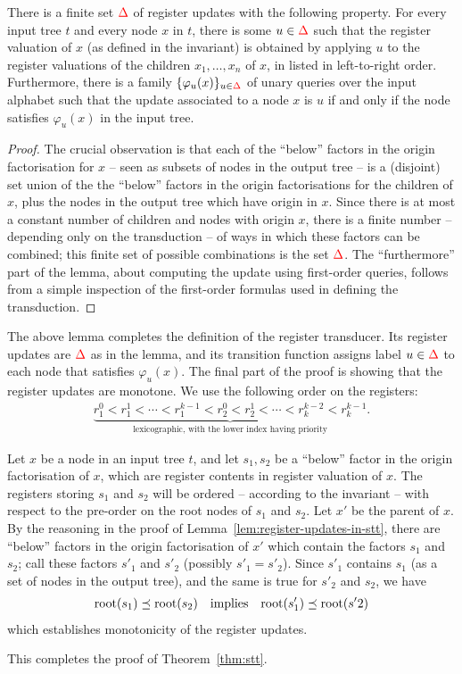 \begin{lemma}\label{lem:register-updates-in-stt}
    There is a finite set ${\color{red}{\Delta}}$ of register updates with the following property. For every  input tree $t$ and every node $x$ in $t$,   there is some $u \in {\color{red}{\Delta}}$ such that the register valuation of $x$ (as defined in the invariant) is obtained by applying $u$ to the register valuations of the children $x_1,\ldots,x_n$ of $x$, in listed in left-to-right order. 
Furthermore, there is a family
$\{\varphi_u(x)\}_{u \in {\color{red}{\Delta}}}$  of unary queries over the input alphabet such that the update associated to a node $x$ is $u$ if and only if the node satisfies $\varphi_u(x)$ in the input tree. 
\end{lemma}
\begin{proof}
    The crucial observation is that each of the ``below'' factors in the origin factorisation for $x$  -- seen as subsets of nodes in the output tree -- is a (disjoint) set union of the   the ``below'' factors in the origin factorisations for the children of $x$, plus the nodes in the output tree which have origin in $x$. Since there is at most a constant number of children and nodes with origin $x$, there is a finite number -- depending only on the transduction -- of ways in which these factors can be combined; this finite set of possible combinations is the set ${\color{red}{\Delta}}$. The ``furthermore'' part of the lemma, about computing the update using first-order queries, follows from a simple inspection of the first-order formulas used in defining the  transduction. 
\end{proof}

The above lemma completes the definition of the register transducer. Its register updates are ${\color{red}{\Delta}}$ as in the lemma, and its transition function assigns label $u \in {\color{red}{\Delta}}$ to each node that satisfies $\varphi_u(x)$. The final part of the proof is showing that the register updates are monotone. We use the  following order on the registers:
\begin{align*}
\underbrace{r_1^0 < r_1^1 < \cdots < r_1^{k-1} < r_2^0 < r_2^1 < \cdots < r_k^{k-2} < r_k^{k-1}}_{\text{lexicographic, with the lower index having priority}}.
\end{align*}

Let $x$ be a node in an input tree $t$, and let $s_1,s_2$ be a ``below'' factor in the origin factorisation of $x$, which are register contents in register valuation of $x$. The registers storing $s_1$ and $s_2$ will be ordered -- according to the invariant -- with respect to the pre-order on the root nodes of $s_1$ and $s_2$. Let $x'$ be the parent of $x$. By the reasoning in the proof of Lemma~\ref{lem:register-updates-in-stt}, there are ``below'' factors in the origin factorisation of $x'$ which contain the factors $s_1$ and $s_2$; call these factors  $s'_1$ and $s'_2$ (possibly $s'_1=s'_2$). Since $s'_1$ contains $s_1$ (as a set of nodes in the output tree), and the same is true for $s'_2$ and $s_2$, we have 
\begin{align*}
\mathrm{root}(s_1) \preceq \mathrm{root}(s_2) \quad \text{implies} \quad \mathrm{root}(s'_1) \preceq \mathrm{root}(s'2)
\end{align*}
which establishes monotonicity of the register updates. 

This completes the proof of Theorem~\ref{thm:stt}.